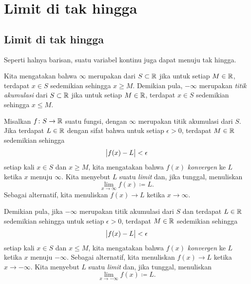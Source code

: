 
\sectionnewpage
\section{Limit di tak hingga}
\label{sec:limitatinf}



\subsection{Limit di tak hingga}

Seperti halnya barisan, suatu variabel kontinu juga dapat menuju tak hingga.

\begin{defn}
Kita mengatakan bahwa $\infty$ merupakan \emph{} dari $S \subset {\mathbb{R}}$ jika untuk setiap
$M \in {\mathbb{R}}$, terdapat $x \in S$ sedemikian sehingga $x \geq M$.  Demikian pula,
$- \infty$ merupakan \emph{titik akumulasi} dari $S \subset {\mathbb{R}}$ jika untuk setiap
$M \in {\mathbb{R}}$, terdapat $x \in S$ sedemikian sehingga $x \leq M$.

%
Misalkan $f \colon S \to {\mathbb{R}}$ suatu fungsi, dengan 
$\infty$ merupakan titik akumulasi dari $S$.
Jika terdapat $L \in {\mathbb{R}}$
dengan sifat
bahwa untuk setiap $\epsilon > 0$, terdapat $M \in {\mathbb{R}}$ sedemikian sehingga
\begin{equation*}
\bigl\lvert {f(x) - L} \bigr\rvert < \epsilon 
\end{equation*}
setiap kali $x \in S$ dan $x \geq M$, kita mengatakan bahwa $f(x)$
\emph{konvergen} ke $L$
ketika $x$ menuju $\infty$.  Kita menyebut $L$ suatu \emph{limit}
dan, jika tunggal, menuliskan
\begin{equation*}
\lim_{x \to \infty} f(x) \coloneqq L .
\end{equation*}
Sebagai alternatif, kita menuliskan $f(x) \to L$ ketika $x \to \infty$.

Demikian pula, jika $-\infty$ merupakan titik akumulasi dari $S$
dan
terdapat $L \in {\mathbb{R}}$
sedemikian sehingga untuk setiap $\epsilon > 0$, terdapat $M \in {\mathbb{R}}$ sedemikian sehingga
\begin{equation*}
\bigl\lvert {f(x) - L} \bigr\rvert < \epsilon 
\end{equation*}
setiap kali $x \in S$ dan $x \leq M$, kita mengatakan bahwa $f(x)$ \emph{konvergen} ke $L$
ketika $x$ menuju $-\infty$.
Sebagai alternatif, kita menuliskan $f(x) \to L$ ketika $x \to -\infty$.
Kita menyebut $L$ suatu \emph{limit} dan, jika tunggal, menuliskan
\begin{equation*}
\lim_{x \to -\infty} f(x) \coloneqq L .
\end{equation*}
\end{defn}

